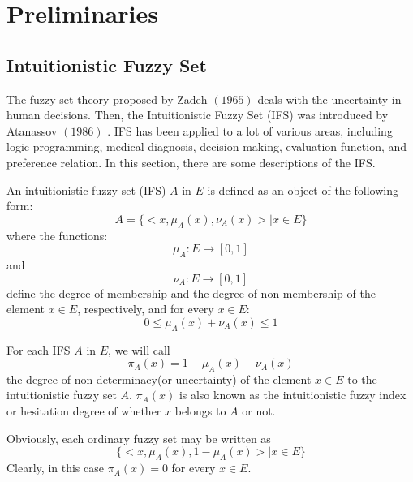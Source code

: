\chapter{Preliminaries}
\begin{flushleft}
\section{Intuitionistic Fuzzy Set}
 The fuzzy set theory proposed by Zadeh $(1965)$ \cite{12} deals
with the uncertainty in human decisions. Then, the Intuitionistic Fuzzy Set (IFS)
was introduced by Atanassov $(1986)$ \cite{2}. IFS has been applied
to a lot of various areas, including logic programming,
medical diagnosis, decision-making, evaluation function,
and preference relation. In this section, there are some descriptions of the IFS.
\vspace{0.3cm}

\linebreak

  An intuitionistic fuzzy set (IFS) $A$ in $E$ is defined as an object of the following form:
\begin{equation*}
    A=\{<x,\mu_A (x),\nu_A(x)> \vert x\in E\}
\end{equation*}
where the functions:
\begin{equation*}
    \mu_A : E \rightarrow [0,1]
\end{equation*}
and
\begin{equation*}
    \nu_A : E \rightarrow [0,1]
\end{equation*}
define the degree of membership and the degree of non-membership of the
element $x \in E$, respectively, and for every $x \in E$:
\begin{equation*}
    0\leq \mu_A (x)+\nu_A(x) \leq 1
\end{equation*}

For each IFS $A$ in $E$, we will call 
\begin{equation*}
    \pi_A (x)= 1-\mu_A (x)-\nu_A(x)
\end{equation*}
the degree of non-determinacy(or uncertainty) of the element $x\in E$ to the intuitionistic fuzzy set $A$.
$\pi_A (x)$ is also known as the intuitionistic fuzzy index or hesitation degree of whether $x$ belongs to $A$ or not.


Obviously, each ordinary fuzzy set may be written as
\begin{equation*}
 \{<x,\mu_A (x),1-\mu_A(x)> \vert x\in E\}   
\end{equation*}
Clearly, in this case $\pi_A(x)=0$ for every $x\in E$.


\end{flushleft}
